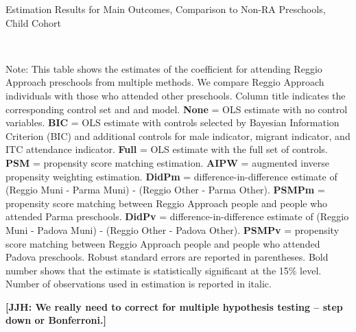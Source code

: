 \begin{table}[H] \caption{Estimation Results for Main Outcomes, Comparison to Non-RA Preschools, Child Cohort} \label{ols-M-child-reg-pres}
\scalebox{0.7}{}
\vspace{1ex} \\
\footnotesize\raggedright{Note: This table shows the estimates of the coefficient for attending Reggio Approach preschools from multiple methods. We compare Reggio Approach individuals with those who attended other preschools. Column title indicates the corresponding control set and and model. \textbf{None} = OLS estimate with no control variables. \textbf{BIC} = OLS estimate with controls selected by Bayesian Information Criterion (BIC) and additional controls for male indicator, migrant indicator, and ITC attendance indicator. \textbf{Full} = OLS estimate with the full set of controls. \textbf{PSM} =  propensity score matching estimation. \textbf{AIPW} = augmented inverse propensity weighting estimation. \textbf{DidPm} = difference-in-difference estimate of (Reggio Muni - Parma Muni) - (Reggio Other - Parma Other). \textbf{PSMPm} = propensity score matching between Reggio Approach people and people who attended Parma preschools. \textbf{DidPv} = difference-in-difference estimate of (Reggio Muni - Padova Muni) - (Reggio Other - Padova Other). \textbf{PSMPv} = propensity score matching between Reggio Approach people and people who attended Padova preschools. Robust standard errors are reported in parentheses. Bold number shows that the estimate is statistically significant at the 15\% level. Number of observations used in estimation is reported in italic.}

\end{table}

\textbf{[JJH: We really need to correct for multiple hypothesis testing -- step down or Bonferroni.]}


